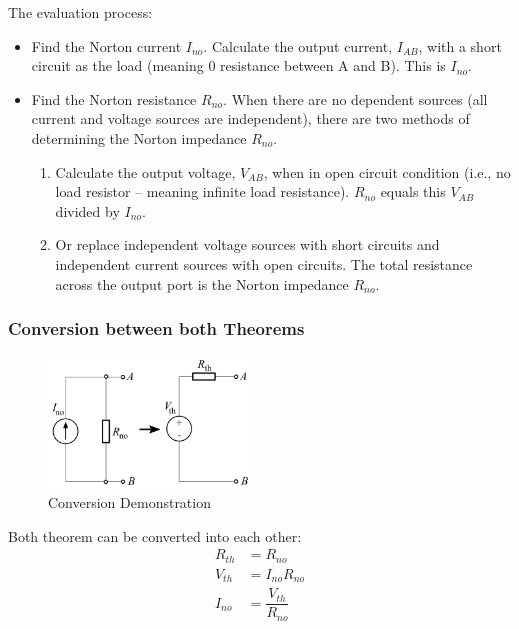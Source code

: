 \documentclass[UTF8]{article}
\begin{document}
The evaluation process:
\begin{itemize}
\item Find the Norton current $I_{no}$. Calculate the output current, $I_{AB}$, with a short circuit as the load (meaning 0 resistance between A and B). This is $I_{no}$.
\item Find the Norton resistance $R_{no}$. When there are no dependent sources (all current and voltage sources are independent), there are two methods of determining the Norton impedance $R_{no}$.
\begin{enumerate}
\item Calculate the output voltage, $V_{AB}$, when in open circuit condition (i.e., no load resistor – meaning infinite load resistance). $R_{no}$ equals this $V_{AB}$ divided by $I_{no}$.
\item Or replace independent voltage sources with short circuits and independent current sources with open circuits. The total resistance across the output port is the Norton impedance $R_{no}$.
\end{enumerate}
\end{itemize}
\subsubsection{Conversion between both Theorems}
\begin{figure}
  \vspace{-50pt}
  \begin{center}
    \includegraphics[width=0.48\textwidth]{Norton-to-thevenin.png}
  \end{center}
  \vspace{-20pt}
  \caption{Conversion Demonstration}
  \vspace{-10pt}
\end{figure}
Both theorem can be converted into each other:
\begin{align*}
R_{th}&=R_{no}\\
V_{th}&=I_{no}R_{no}\\
I_{no}&=\dfrac{V_{th}}{R_{no}}
\end{align*}
\end{document}
